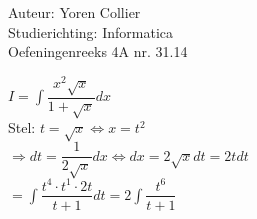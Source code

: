 \documentclass[a4paper]{article}
\newcommand{\asa}{\Leftrightarrow} %
\newcommand{\adR}{\Rightarrow} %
\newcommand{\intgrl}{\displaystyle\int} %
\begin{document}
\noindent \large Auteur: Yoren Collier \\
\noindent \large Studierichting: Informatica\\
\noindent \large Oefeningenreeks 4A nr. 31.14\\

\medskip

\normalsize

$ I =  \intgrl \dfrac{x^2 \sqrt{x}}{1+\sqrt{x}} dx$\\

Stel: $t = \sqrt{x} \asa x = t^2$\\

$\adR dt = \dfrac{1}{2\sqrt{x}}dx \asa dx = 2 \sqrt{x}dt = 2tdt $\\

$= \intgrl \dfrac{t^4 \cdot t^1 \cdot 2t}{t+1} dt = 2 \intgrl \dfrac{t^6}{t+1}$\\
\end{document}
